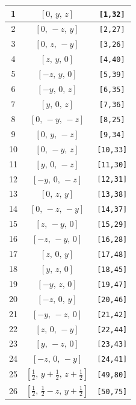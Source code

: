 \documentclass[fleqn,8pt]{jsarticle}
\begin{document}
\begin{longtable}{ccc}
1 & $\left[ 0,\, y,\, z \right]$ & {\tt [1,32]} \\ \hline
2 & $\left[ 0,\, - z,\, y \right]$ & {\tt [2,27]} \\ \hline
3 & $\left[ 0,\, z,\, - y \right]$ & {\tt [3,26]} \\ \hline
4 & $\left[ z,\, y,\, 0 \right]$ & {\tt [4,40]} \\ \hline
5 & $\left[ - z,\, y,\, 0 \right]$ & {\tt [5,39]} \\ \hline
6 & $\left[ - y,\, 0,\, z \right]$ & {\tt [6,35]} \\ \hline
7 & $\left[ y,\, 0,\, z \right]$ & {\tt [7,36]} \\ \hline
8 & $\left[ 0,\, - y,\, - z \right]$ & {\tt [8,25]} \\ \hline
9 & $\left[ 0,\, y,\, - z \right]$ & {\tt [9,34]} \\ \hline
10 & $\left[ 0,\, - y,\, z \right]$ & {\tt [10,33]} \\ \hline
11 & $\left[ y,\, 0,\, - z \right]$ & {\tt [11,30]} \\ \hline
12 & $\left[ - y,\, 0,\, - z \right]$ & {\tt [12,31]} \\ \hline
13 & $\left[ 0,\, z,\, y \right]$ & {\tt [13,38]} \\ \hline
14 & $\left[ 0,\, - z,\, - y \right]$ & {\tt [14,37]} \\ \hline
15 & $\left[ z,\, - y,\, 0 \right]$ & {\tt [15,29]} \\ \hline
16 & $\left[ - z,\, - y,\, 0 \right]$ & {\tt [16,28]} \\ \hline
17 & $\left[ z,\, 0,\, y \right]$ & {\tt [17,48]} \\ \hline
18 & $\left[ y,\, z,\, 0 \right]$ & {\tt [18,45]} \\ \hline
19 & $\left[ - y,\, z,\, 0 \right]$ & {\tt [19,47]} \\ \hline
20 & $\left[ - z,\, 0,\, y \right]$ & {\tt [20,46]} \\ \hline
21 & $\left[ - y,\, - z,\, 0 \right]$ & {\tt [21,42]} \\ \hline
22 & $\left[ z,\, 0,\, - y \right]$ & {\tt [22,44]} \\ \hline
23 & $\left[ y,\, - z,\, 0 \right]$ & {\tt [23,43]} \\ \hline
24 & $\left[ - z,\, 0,\, - y \right]$ & {\tt [24,41]} \\ \hline
25 & $\left[ \frac{1}{2},\, y + \frac{1}{2},\, z + \frac{1}{2} \right]$ & {\tt [49,80]} \\ \hline
26 & $\left[ \frac{1}{2},\, \frac{1}{2} - z,\, y + \frac{1}{2} \right]$ & {\tt [50,75]} \\ \hline

\end{longtable}
\end{document}
